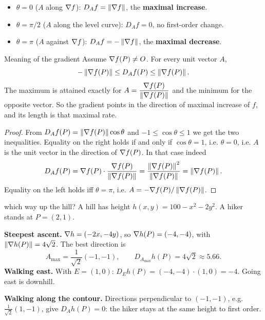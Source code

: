 \begin{itemize}
  \item $\theta=0$ ($A$ along $\nabla f$): $D_Af=\left\lVert \nabla f\right\rVert$, the \textbf{maximal increase}.
  \item $\theta=\pi/2$ ($A$ along the level curve): $D_Af=0$, no first-order change.
  \item $\theta=\pi$ ($A$ against $\nabla f$): $D_Af=-\left\lVert \nabla f\right\rVert$, the \textbf{maximal decrease}.
\end{itemize}

\begin{theorem}{Meaning of the gradient}
Assume $\nabla f(P)\neq O$. For every unit vector $A$,
\[ -\left\lVert \nabla f(P)\right\rVert\le D_Af(P)\le\left\lVert \nabla f(P)\right\rVert . \]
The maximum is attained exactly for $A=\dfrac{\nabla f(P)}{\left\lVert \nabla f(P)\right\rVert}$ and the
minimum for the opposite vector. So the gradient points in the direction of maximal
increase of $f$, and its length is that maximal rate.
\end{theorem}

\begin{proof}
From $D_Af(P)=\left\lVert \nabla f(P)\right\rVert\cos\theta$ and $-1\le\cos\theta\le1$ we get the two
inequalities. Equality on the right holds if and only if $\cos\theta=1$, i.e. $\theta=0$,
i.e. $A$ is the unit vector in the direction of $\nabla f(P)$. In that case indeed
\[ D_Af(P)=\nabla f(P)\cdot\frac{\nabla f(P)}{\left\lVert \nabla f(P)\right\rVert}=\frac{\left\lVert \nabla f(P)\right\rVert^2}{\left\lVert \nabla f(P)\right\rVert}=\left\lVert \nabla f(P)\right\rVert . \]
Equality on the left holds iff $\theta=\pi$, i.e. $A=-\nabla f(P)/\left\lVert \nabla f(P)\right\rVert$.
\end{proof}

\begin{example}{which way up the hill?}
A hill has height $h(x,y)=100-x^2-2y^2$. A hiker stands at $P=(2,1)$.

\textbf{Steepest ascent.} $\nabla h=(-2x,-4y)$, so $\nabla h(P)=(-4,-4)$, with
$\left\lVert \nabla h(P)\right\rVert=4\sqrt2$. The best direction is
\[ A_{\max}=\frac{1}{\sqrt2}(-1,-1),\qquad D_{A_{\max}}h(P)=4\sqrt2\approx5.66 . \]
\textbf{Walking east.} With $E=(1,0)$: $D_Eh(P)=(-4,-4)\cdot(1,0)=-4$. Going east is
downhill.

\textbf{Walking along the contour.} Directions perpendicular to $(-1,-1)$, e.g.
$\frac{1}{\sqrt2}(1,-1)$, give $D_Ah(P)=0$: the hiker stays at the same height to first order.
\end{example}

